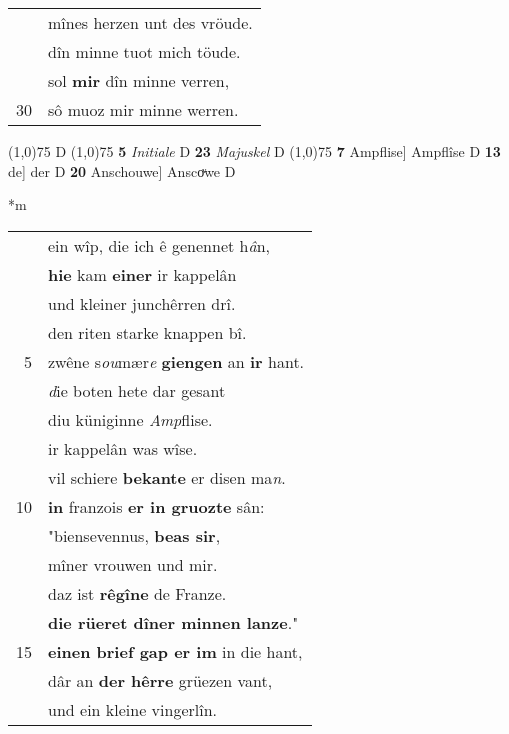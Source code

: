 \documentclass[8pt,a4paper,notitlepage]{article}
\begin{document}
\begin{table}[ht]
\begin{minipage}[t]{0.5\linewidth}
\begin{tabular}{rl}
 & mînes herzen unt des vröude.\\ 
 & dîn minne tuot mich töude.\\ 
 & sol \textbf{mir} dîn minne verren,\\ 
30 & sô muoz mir minne werren.\\ 
\end{tabular}
\scriptsize
\line(1,0){75} \newline
D \newline
\line(1,0){75} \newline
\textbf{5} \textit{Initiale} D  \textbf{23} \textit{Majuskel} D  \newline
\line(1,0){75} \newline
\textbf{7} Ampflise] Ampflîse D \textbf{13} de] der D \textbf{20} Anschouwe] Anscoͮwe D \newline
\end{minipage}
\hspace{0.5cm}
\begin{minipage}[t]{0.5\linewidth}
\small
\begin{center}*m
\end{center}
\begin{tabular}{rl}
 & ein wîp, die ich ê genennet h\textit{â}n,\\ 
 & \textbf{hie} kam \textbf{einer} ir kappelân\\ 
 & und kleiner junchêrren drî.\\ 
 & den riten starke knappen bî.\\ 
5 & zwêne s\textit{ou}mær\textit{e} \textbf{giengen} an \textbf{ir} hant.\\ 
 & \textit{d}ie boten hete dar gesant\\ 
 & diu küniginne \textit{Amp}flise.\\ 
 & ir kappelân was wîse.\\ 
 & vil schiere \textbf{bekante} er disen ma\textit{n}.\\ 
10 & \textbf{in} franzois \textbf{er in gruozte} sân:\\ 
 & "biensevennus, \textbf{beas sir},\\ 
 & mîner vrouwen und mir.\\ 
 & daz ist \textbf{rêgîne} de Franze.\\ 
 & \textbf{die rüeret dîner minnen lanze}."\\ 
15 & \textbf{einen brief gap er im} in die hant,\\ 
 & dâr an \textbf{der hêrre} grüezen vant,\\ 
 & und ein kleine vingerlîn.\\ 

\end{tabular}
\end{minipage}
\end{table}
\end{document}
